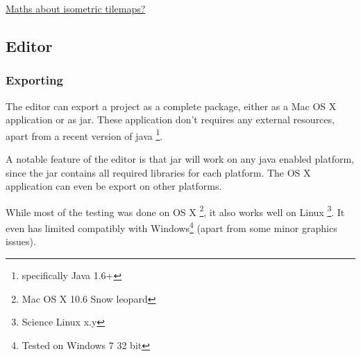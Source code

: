 \underline{Maths about isometric tilemaps? }



\subsection{Editor}

\subsubsection{Exporting}
The editor can export a project as a complete package, either as a Mac OS X application or as jar. These application don't requires any external resources, apart from a recent version of java \footnote{specifically Java 1.6+}.

A notable feature of the editor is that jar will work on any java enabled platform, since the jar contains all required libraries for each platform. The OS X application can even be export on other platforms.

While most of the testing was done on OS X \footnote{Mac OS X 10.6 Snow leopard}, it also works well on Linux \footnote{Science  Linux x.y}. It even has limited compatibly with Windows\footnote{Tested on Windows 7 32 bit} (apart from some minor graphics issues).